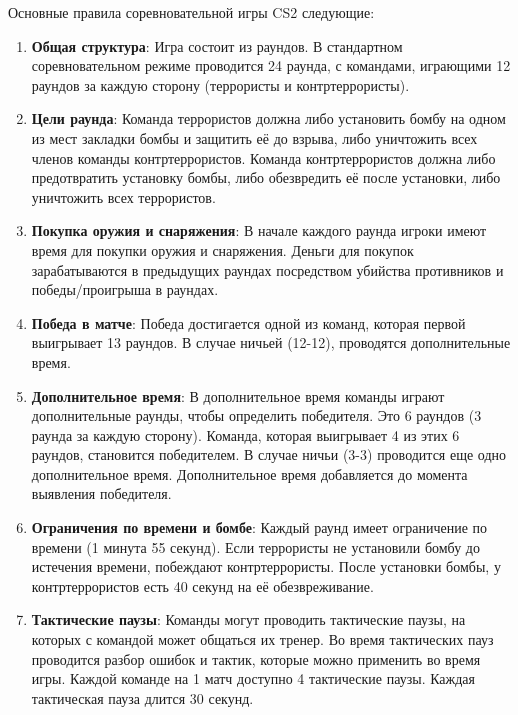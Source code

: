 Основные правила соревновательной игры CS2 следующие: 
\begin{enumerate}
	\item \textbf{Общая структура}:
	Игра состоит из раундов. В стандартном соревновательном режиме проводится 24 раунда, с командами, играющими 12 раундов за каждую сторону (террористы и контртеррористы).
	
	\item \textbf{Цели раунда}:
	Команда террористов должна либо установить бомбу на одном из мест закладки бомбы и защитить её до взрыва, либо уничтожить всех членов команды контртеррористов. Команда контртеррористов должна либо предотвратить установку бомбы, либо обезвредить её после установки, либо уничтожить всех террористов.
	
	\item \textbf{Покупка оружия и снаряжения}:
	В начале каждого раунда игроки имеют время для покупки оружия и снаряжения. Деньги для покупок зарабатываются в предыдущих раундах посредством убийства противников и победы/проигрыша в раундах.
	
	\item \textbf{Победа в матче}:
	Победа достигается одной из команд, которая первой выигрывает 13 раундов. В случае ничьей (12-12), проводятся дополнительные время.
	
	\item \textbf{Дополнительное время}:
	В дополнительное время команды играют дополнительные раунды, чтобы определить победителя. Это 6 раундов (3 раунда за каждую сторону). Команда, которая выигрывает 4 из этих 6 раундов, становится победителем. В случае ничьи (3-3) проводится еще одно дополнительное время. Дополнительное время добавляется до момента выявления победителя.
	
	\item \textbf{Ограничения по времени и бомбе}:
	Каждый раунд имеет ограничение по времени (1 минута 55 секунд). Если террористы не установили бомбу до истечения времени, побеждают контртеррористы. После установки бомбы, у контртеррористов есть 40 секунд на её обезвреживание.
	
	\item \textbf{Тактические паузы}:
	Команды могут проводить тактические паузы, на которых с командой может общаться их тренер. Во время тактических пауз проводится разбор ошибок и тактик, которые можно применить во время игры. Каждой команде на 1 матч доступно 4 тактические паузы. Каждая тактическая пауза длится 30 секунд.
\end{enumerate}

